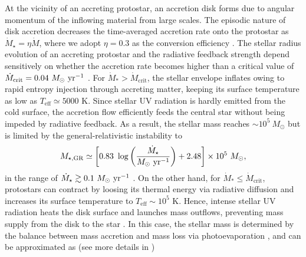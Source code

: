 \documentclass[twocolumn, twocolappendix]{aastex63}
\newcommand{\Msun}{M_\odot}
\newcommand{\Msunyr}{M_\odot~{\rm yr}^{-1}}
\newcommand{\Mdot}{\dot{M}}
\newcommand{\blue}[1]{\textcolor{blue}{ #1}}
\begin{document}
\begin{CJK*}{UTF8}{gbsn}
At the vicinity of an accreting protostar, an accretion disk forms due to angular momentum of the inflowing material from large scales. 
The episodic nature of disk accretion decreases the time-averaged accretion rate onto the protostar as $\Mdot_{\star}=\eta \Mdot$, 
where we adopt $\eta=0.3$ as the conversion efficiency \citep[][Toyouchi 2022]{2016MNRAS.459.1137S}. 
The stellar radius evolution of an accreting protostar and the radiative feedback strength depend sensitively on whether
the accretion rate becomes higher than a critical value of $\dot{M}_{\mathrm{crit}}=0.04~\Msunyr$ 
\citep{2001ApJ...561L..55O,2013ApJ...778..178H,2013A&A...558A..59S,2015MNRAS.452..755S,2018MNRAS.474.2757H}.
For $\dot{M}_\ast > \Mdot_\mathrm{crit}$, the stellar envelope inflates owing to rapid entropy injection through accreting matter,
keeping its surface temperature as low as $T_\mathrm{eff} \simeq 5000$ K. 
Since stellar UV radiation is hardly emitted from the cold surface, the accretion flow efficiently feeds the central star without being 
impeded by radiative feedback.
As a result, the stellar mass reaches $\sim 10^5~\Msun$ but is limited by the general-relativistic instability to
%
\begin{equation}
 M_{\star, \mathrm{GR}} \simeq\left[0.83~\log \left(\frac{\dot{M}_{\star}}{\Msunyr}\right)+2.48\right] \times 10^{5} ~\Msun,
\end{equation}
%
in the range of $\dot{M}_\star\gtrsim 0.1~\Msunyr$ \citep{2016PhRvD..94b1501S,2017ApJ...842L...6W,2019PASA...36...27W}.
On the other hand, for $\dot{M}_\ast \leq \Mdot_\mathrm{crit}$, protostars can contract by loosing its thermal energy via radiative diffusion
and increases its surface temperature to $T_\mathrm{eff} \sim 10^5$ K.
Hence, intense stellar UV radiation heats the disk surface and launches mass outflows, preventing mass supply from the disk to the star
\citep{2008ApJ...681..771M,2011Sci...334.1250H}. 
In this case, the stellar mass is determined by the balance between mass accretion and mass loss via photoevaporation \citep{2013ApJ...773..155T},
and can be approximated as (see more details in \citealt{2021ApJ...917...60L})

\end{CJK*}
\end{document}
